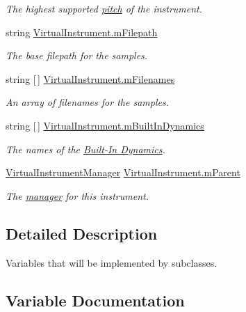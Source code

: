 \begin{DoxyCompactItemize}
\begin{DoxyCompactList}\small\item\em The highest supported \hyperlink{group___music_enums_ga508f69b199ea518f935486c990edac1d}{pitch} of the instrument. \end{DoxyCompactList}\item 
string \hyperlink{group___v_i_base_pro_var_gac428224be859933d720a9c533fdb5643}{Virtual\+Instrument.\+m\+Filepath}
\begin{DoxyCompactList}\small\item\em The base filepath for the samples. \end{DoxyCompactList}\item 
string \mbox{[}$\,$\mbox{]} \hyperlink{group___v_i_base_pro_var_gab2add474ca506357688b5dd08cac4cb5}{Virtual\+Instrument.\+m\+Filenames}
\begin{DoxyCompactList}\small\item\em An array of filenames for the samples. \end{DoxyCompactList}\item 
string \mbox{[}$\,$\mbox{]} \hyperlink{group___v_i_base_pro_var_ga87961e72f25fbc2256b614a394aa6f13}{Virtual\+Instrument.\+m\+Built\+In\+Dynamics}
\begin{DoxyCompactList}\small\item\em The names of the \hyperlink{group___audio_DefBID}{Built-\/\+In Dynamics}. \end{DoxyCompactList}\item 
\hyperlink{class_virtual_instrument_manager}{Virtual\+Instrument\+Manager} \hyperlink{group___v_i_base_pro_var_gae4a87a656d9448cfea28215a6b9c3840}{Virtual\+Instrument.\+m\+Parent}
\begin{DoxyCompactList}\small\item\em The \hyperlink{group___v_i_m}{manager} for this instrument. \end{DoxyCompactList}\end{DoxyCompactItemize}


\subsection{Detailed Description}
Variables that will be implemented by subclasses. 

\subsection{Variable Documentation}
\mbox{\label{group___v_i_base_pro_var_ga52e76d9b74408660584676035a92a2c6}} 

